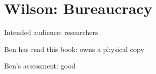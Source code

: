 \section{Wilson: Bureaucracy}

\cite{1991_Wilson}

Intended audience: researchers

Ben has read this book: owns a physical copy

Ben's assessment: good